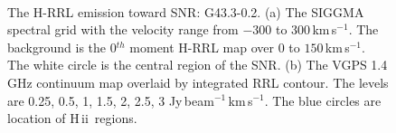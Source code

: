 \documentclass[manuscript]{aastex61}
\newcommand{\hii}{{\rm H\,}{{\sc ii}}}
\newcommand{\kms}{\,km\,s$^{-1}$}
\begin{document}
\begin{figure}[H]
	\centering
	\\
	\caption{The H-RRL emission toward SNR: G43.3-0.2.
	(a) The SIGGMA spectral grid with the velocity range from $-300$ to $300$\kms.
	The background is the 0$^{th}$ moment H-RRL map over $0$ to $150$\kms.
	The white circle is the central region of the SNR.
	(b) The VGPS 1.4 GHz continuum map overlaid by integrated RRL contour.
	The levels are 0.25, 0.5, 1, 1.5, 2, 2.5, 3 Jy\,beam$^{-1}$\kms.
	The blue circles are location of \hii\ regions.
	}
	\label{fig_snr-g433}
\end{figure}
\end{document}
